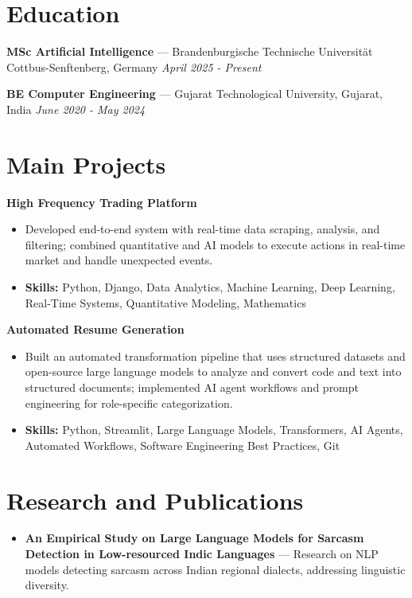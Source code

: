 \documentclass[a4paper,10pt]{article}
\begin{document}
\section*{Education}
\textbf{MSc Artificial Intelligence} — Brandenburgische Technische Universität Cottbus-Senftenberg, Germany \hfill \textit{April 2025 - Present}\par
\vspace{1.5pt}
\textbf{BE Computer Engineering} — Gujarat Technological University, Gujarat, India \hfill \textit{June 2020 - May 2024}\par

\section*{Main Projects}
\textbf{High Frequency Trading Platform}\par
\vspace{1pt}
\begin{itemize}
  \item Developed end-to-end system with real-time data scraping, analysis, and filtering; combined quantitative and AI models to execute actions in real-time market and handle unexpected events.
  \item \textbf{Skills:} Python, Django, Data Analytics, Machine Learning, Deep Learning, Real-Time Systems, Quantitative Modeling, Mathematics
\end{itemize}
\vspace{3pt}
\textbf{Automated Resume Generation}\par
\vspace{1pt}
\begin{itemize}
  \item Built an automated transformation pipeline that uses structured datasets and open-source large language models to analyze and convert code and text into structured documents; implemented AI agent workflows and prompt engineering for role-specific categorization.
  \item \textbf{Skills:} Python, Streamlit, Large Language Models, Transformers, AI Agents, Automated Workflows, Software Engineering Best Practices, Git
\end{itemize}

\section*{Research and Publications}
\begin{itemize}
\item \textbf{An Empirical Study on Large Language Models for Sarcasm Detection in Low-resourced Indic Languages} — Research on NLP models detecting sarcasm across Indian regional dialects, addressing linguistic diversity.
\end{itemize}
\end{document}
